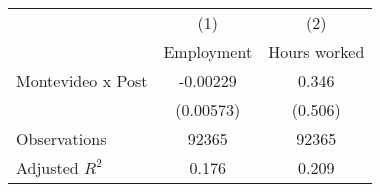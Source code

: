 {
\def\sym#1{\ifmmode^{#1}\else\(^{#1}\)\fi}
\begin{tabular}{l*{2}{c}}
\hline\hline
                &\multicolumn{1}{c}{(1)}&\multicolumn{1}{c}{(2)}\\
                &\multicolumn{1}{c}{Employment}&\multicolumn{1}{c}{Hours worked}\\
\hline
Montevideo x Post& -0.00229         &    0.346         \\
                &(0.00573)         &  (0.506)         \\
\hline
Observations    &    92365         &    92365         \\
Adjusted \(R^{2}\)&    0.176         &    0.209         \\
\hline\hline
\end{tabular}
}

